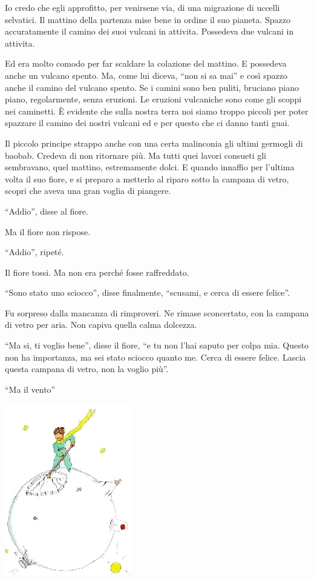 \documentclass[11pt]{scrbook}
\begin{document}
Io credo che egli approfitto, per venirsene via, di una migrazione di
uccelli selvatici. Il mattino della partenza mise bene in ordine il suo
pianeta. Spazzo accuratamente il camino dei suoi vulcani in attivita.
Possedeva due vulcani in attivita.

Ed era molto comodo per far scaldare la colazione del mattino. E
possedeva anche un vulcano spento. Ma, come lui diceva, ``non si sa
mai'' e così spazzo anche il camino del vulcano spento. Se i camini sono
ben puliti, bruciano piano piano, regolarmente, senza eruzioni. Le
eruzioni vulcaniche sono come gli scoppi nei caminetti. È evidente che
sulla nostra terra noi siamo troppo piccoli per poter spazzare il camino
dei nostri vulcani ed e per questo che ci danno tanti guai.

Il piccolo principe strappo anche con una certa malinconia gli ultimi
germogli di baobab. Credeva di non ritornare più. Ma tutti quei lavori
consueti gli sembravano, quel mattino, estremamente dolci. E quando
innaffio per l'ultima volta il suo fiore, e si preparo a metterlo al
riparo sotto la campana di vetro, scopri che aveva una gran voglia di
piangere.

``Addio'', disse al fiore.

Ma il fiore non rispose.

``Addio'', ripeté.

Il fiore tossi. Ma non era perché fosse raffreddato.

``Sono stato uno sciocco'', disse finalmente, ``scusami, e cerca di
essere felice''.

Fu sorpreso dalla mancanza di rimproveri. Ne rimase sconcertato, con la
campana di vetro per aria. Non capiva quella calma dolcezza.

``Ma si, ti voglio bene'', disse il fiore, ``e tu non l'hai saputo per
colpa mia. Questo non ha importanza, ma sei stato sciocco quanto me.
Cerca di essere felice. Lascia questa campana di vetro, non la voglio
più''.

``Ma il vento''

\begin{center}
\includegraphics{img/9a}
\end{center}
\end{document}
